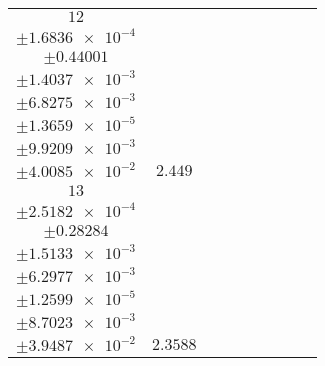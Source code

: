 \documentclass[8pt]{article}
\begin{document}
\begin{longtable}[l]{c c c c c c c c c}
$\num{12}$ & \begin{tabular}[c]{@{}c@{}}$\num{2.9758e-2}$ \\ $\pm\num{1.6836e-4}$\end{tabular} & \begin{tabular}[c]{@{}c@{}}$\num{0.39628}$ \\ $\pm\num{0.44001}$\end{tabular} & \begin{tabular}[c]{@{}c@{}}$\num{6.8093}$ \\ $\pm\num{1.4037e-3}$\end{tabular} & \begin{tabular}[c]{@{}c@{}}$\num{1.4452e+3}$ \\ $\pm\num{6.8275e-3}$\end{tabular} & \begin{tabular}[c]{@{}c@{}}$\num{2.8912}$ \\ $\pm\num{1.3659e-5}$\end{tabular} & \begin{tabular}[c]{@{}c@{}}$\num{1.182}$ \\ $\pm\num{9.9209e-3}$\end{tabular} & \begin{tabular}[c]{@{}c@{}}$\num{3.8343}$ \\ $\pm\num{4.0085e-2}$\end{tabular} & $\num{2.449}$\\
$\num{13}$ & \begin{tabular}[c]{@{}c@{}}$\num{2.9299e-2}$ \\ $\pm\num{2.5182e-4}$\end{tabular} & \begin{tabular}[c]{@{}c@{}}$\num{0.40336}$ \\ $\pm\num{0.28284}$\end{tabular} & \begin{tabular}[c]{@{}c@{}}$\num{7.0884}$ \\ $\pm\num{1.5133e-3}$\end{tabular} & \begin{tabular}[c]{@{}c@{}}$\num{1.4455e+3}$ \\ $\pm\num{6.2977e-3}$\end{tabular} & \begin{tabular}[c]{@{}c@{}}$\num{2.8917}$ \\ $\pm\num{1.2599e-5}$\end{tabular} & \begin{tabular}[c]{@{}c@{}}$\num{1.1678}$ \\ $\pm\num{8.7023e-3}$\end{tabular} & \begin{tabular}[c]{@{}c@{}}$\num{3.6717}$ \\ $\pm\num{3.9487e-2}$\end{tabular} & $\num{2.3588}$\\

\end{longtable}
\end{document}
